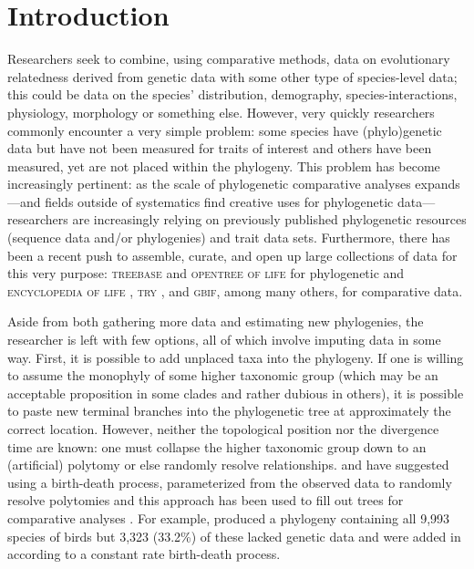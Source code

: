 \documentclass[a4paper,11pt]{article}
\begin{document}
\vfill

\newpage

\section{Introduction}
Researchers seek to combine, using comparative methods, data on evolutionary relatedness derived from genetic data with some other type of species-level data; this could be data on the species' distribution, demography, species-interactions, physiology, morphology or something else.    However, very quickly researchers commonly encounter a very simple problem: some species have (phylo)genetic data but have not been measured for traits of interest and others have been measured, yet are not placed within the phylogeny. This problem has become increasingly pertinent: as the scale of phylogenetic comparative analyses expands---and fields outside of systematics find creative uses for phylogenetic data---researchers are increasingly relying on previously published phylogenetic resources (sequence data and/or phylogenies) and trait data sets. Furthermore,  there has been a recent push to assemble, curate, and open up large collections of data for this very purpose: \textsc{treebase} \citep{treebase} and \textsc{opentree of life} \citep{OpenTree} for phylogenetic and \textsc{encyclopedia of life} \citep{eol}, \textsc{try} \citep{try}, and \textsc{gbif}, among many others, for comparative data. 

Aside from both gathering more data and estimating new phylogenies, the researcher is left with few options, all of which involve imputing data in some way. First, it is possible to add unplaced taxa into the phylogeny. If one is willing to assume the monophyly of some higher taxonomic group (which may be an acceptable proposition in some clades and rather dubious in others), it is possible to paste new terminal branches into the phylogenetic tree at approximately the correct location. However, neither the topological position nor the divergence time are known: one must collapse the higher taxonomic group down to an (artificial) polytomy or else randomly resolve relationships. \citet{Kuhn2011} and \citet{ThomasPastis} have suggested using a birth-death process, parameterized from the observed data to randomly resolve polytomies \citep[see also][for a related approach for fossil trees]{Bapst2013} and this approach has been used to fill out trees for comparative analyses \citep{Jetz2012, Price2012, Rolland2014, Jetz2014}. For example, \citet{Jetz2012} produced a phylogeny containing all 9,993 species of birds but 3,323 (33.2\%) of these lacked genetic data and were added in according to a constant rate birth-death process. 
\end{document}
